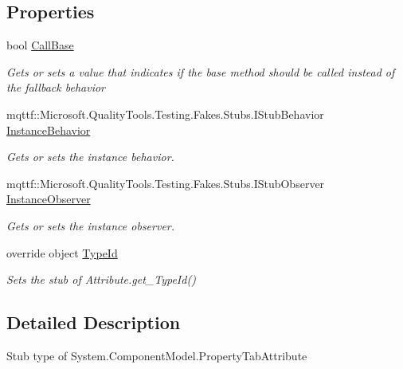 \subsection*{Properties}
\begin{DoxyCompactItemize}
\item 
bool \hyperlink{class_system_1_1_component_model_1_1_fakes_1_1_stub_property_tab_attribute_aff7cc36b3da46dc77894241cb1e277cc}{Call\-Base}
\begin{DoxyCompactList}\small\item\em Gets or sets a value that indicates if the base method should be called instead of the fallback behavior\end{DoxyCompactList}\item 
mqttf\-::\-Microsoft.\-Quality\-Tools.\-Testing.\-Fakes.\-Stubs.\-I\-Stub\-Behavior \hyperlink{class_system_1_1_component_model_1_1_fakes_1_1_stub_property_tab_attribute_a1c093ef73d30f77eb91af3ddf3f4c9d7}{Instance\-Behavior}
\begin{DoxyCompactList}\small\item\em Gets or sets the instance behavior.\end{DoxyCompactList}\item 
mqttf\-::\-Microsoft.\-Quality\-Tools.\-Testing.\-Fakes.\-Stubs.\-I\-Stub\-Observer \hyperlink{class_system_1_1_component_model_1_1_fakes_1_1_stub_property_tab_attribute_a9d3fe2b7a3510631a9d9799cdaf48345}{Instance\-Observer}
\begin{DoxyCompactList}\small\item\em Gets or sets the instance observer.\end{DoxyCompactList}\item 
override object \hyperlink{class_system_1_1_component_model_1_1_fakes_1_1_stub_property_tab_attribute_a366184a48049e478452ac928f3a5a37f}{Type\-Id}
\begin{DoxyCompactList}\small\item\em Sets the stub of Attribute.\-get\-\_\-\-Type\-Id()\end{DoxyCompactList}\end{DoxyCompactItemize}


\subsection{Detailed Description}
Stub type of System.\-Component\-Model.\-Property\-Tab\-Attribute



